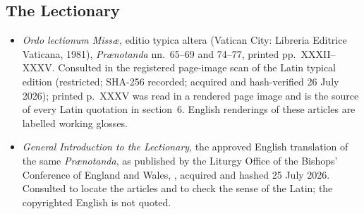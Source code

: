 \subsection*{The Lectionary}

{\fontsize{8.6}{9.6}\selectfont
\begin{itemize}[itemsep=0pt,parsep=0pt,topsep=0.05em]
\item \emph{Ordo lectionum Missæ}, editio typica altera (Vatican City: Libreria Editrice Vaticana, 1981), \emph{Prænotanda} nn.~65--69 and 74--77, printed pp.~XXXII--XXXV. Consulted in the registered page-image scan of the Latin typical edition (restricted; SHA-256 recorded; acquired and hash-verified 26 July 2026); printed p.~XXXV was read in a rendered page image and is the source of every Latin quotation in section~6. English renderings of these articles are labelled working glosses.
\item \emph{General Introduction to the Lectionary}, the approved English translation of the same \emph{Prænotanda}, as published by the Liturgy Office of the Bishops' Conference of England and Wales, , acquired and hashed 25 July 2026. Consulted to locate the articles and to check the sense of the Latin; the copyrighted English is not quoted.
\end{itemize}}

\endgroup
